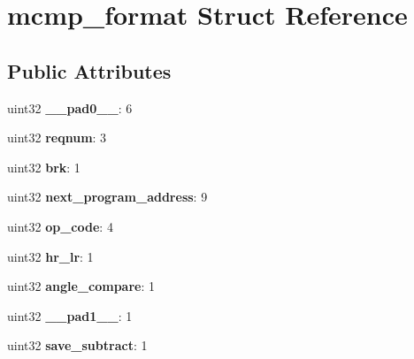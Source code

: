 \hypertarget{structmcmp__format}{}\section{mcmp\+\_\+format Struct Reference}
\label{structmcmp__format}
\subsection*{Public Attributes}
\begin{DoxyCompactItemize}
\item 
\mbox{\label{structmcmp__format_a576121028ca521bc8fe4a31984cec415}} 
uint32 {\bfseries \+\_\+\+\_\+pad0\+\_\+\+\_\+}\+: 6
\item 
\mbox{\label{structmcmp__format_acda86cf2298b9ef5d98f67c6814c1e24}} 
uint32 {\bfseries reqnum}\+: 3
\item 
\mbox{\label{structmcmp__format_a0d65a7a4abd5e1b30277a83a34916783}} 
uint32 {\bfseries brk}\+: 1
\item 
\mbox{\label{structmcmp__format_aefd4ce68910eda13272fa3284827cc7d}} 
uint32 {\bfseries next\+\_\+program\+\_\+address}\+: 9
\item 
\mbox{\label{structmcmp__format_a77c5f2082a2bb76f9a14d23c3bd473f5}} 
uint32 {\bfseries op\+\_\+code}\+: 4
\item 
\mbox{\label{structmcmp__format_ae84bdc0f513f3d8759cd2ee2c2178d29}} 
uint32 {\bfseries hr\+\_\+lr}\+: 1
\item 
\mbox{\label{structmcmp__format_a44d29f7bf1d4364e8f6d0100153355cb}} 
uint32 {\bfseries angle\+\_\+compare}\+: 1
\item 
\mbox{\label{structmcmp__format_ab97a5076cdfcd946841e73612eb124bd}} 
uint32 {\bfseries \+\_\+\+\_\+pad1\+\_\+\+\_\+}\+: 1
\item 
\mbox{\label{structmcmp__format_a9eeb5462be5b0dfbdadc03bf7539e2db}} 
uint32 {\bfseries save\+\_\+subtract}\+: 1
\item 

\end{DoxyCompactItemize}
